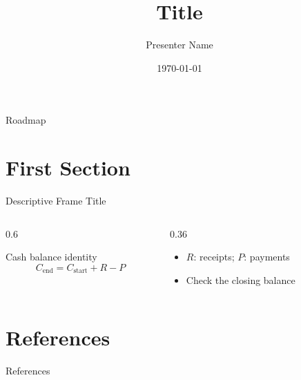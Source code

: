 \documentclass[handout,aspectratio=169,10pt]{beamer}
\title{Title}
\date{\today}
\author{Presenter Name}
\institute[]{Institution Name}
\begin{document}
\maketitle


\begin{frame}{Roadmap}
\tableofcontents
\end{frame}

%

\section{First Section}

\begin{frame}{Descriptive Frame Title}
    \begin{columns}[T]
        \begin{column}{0.6\textwidth}
            \begin{block}{Cash balance identity}
            \[C_{\mathrm{end}} = C_{\mathrm{start}} + R - P\]
            \end{block}
        \end{column}
        \begin{column}{0.36\textwidth}
            \footnotesize
            \begin{itemize}
                \item $R$: receipts; $P$: payments
                \item Check the closing balance
            \end{itemize}
        \end{column}
    \end{columns}
\end{frame}


\appendix

\section*{References}
\begin{frame}[allowframebreaks]{References}
    
    
\end{frame}
\end{document}
